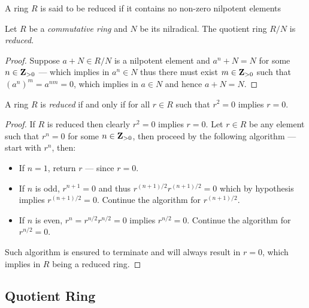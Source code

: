 \begin{definition}
\label{def:reduced-ring}
A ring \(R\) is said to be reduced if it contains no non-zero nilpotent elements
\end{definition}

\begin{corollary}
\label{cor:reducing-with-nilradical}
Let \(R\) be a \emph{commutative ring} and \(N\) be its nilradical. The quotient
ring \(R/N\) is \emph{reduced}.
\end{corollary}

\begin{proof}
Suppose \(a + N \in R/N\) is a nilpotent element and \(a^n + N = N\) for some
\(n \in \mathbf{Z}_{>0}\) --- which implies in \(a^n \in N\) thus there must exist
\(m \in \mathbf{Z}_{>0}\) such that \((a^n)^m = a^{nm} = 0\), which implies in
\(a \in N\) and hence \(a + N = N\).
\end{proof}

\begin{lemma}
\label{lem:reduced-iff-r2=0-implies-r=0}
A ring \(R\) is \emph{reduced} if and only if for all \(r \in R\) such that
\(r^2 = 0\) implies \(r = 0\).
\end{lemma}

\begin{proof}
If \(R\) is reduced then clearly \(r^2 = 0\) implies \(r = 0\). Let \(r \in R\)
be any element such that \(r^n = 0\) for some \(n \in \mathbf{Z}_{>0}\), then proceed
by the following algorithm --- start with \(r^n\), then:
\begin{itemize}\setlength\itemsep{0em}
\item If \(n = 1\), return \(r\) --- since \(r = 0\).
\item If \(n\) is odd, \(r^{n + 1} = 0\) and thus
  \(r^{(n+1)/2} r^{(n+1)/2} = 0\) which by hypothesis implies \(r^{(n+1)/2} =
  0\). Continue the algorithm for \(r^{(n+1)/2}\).
\item If \(n\) is even, \(r^n = r^{n/2} r^{n/2} = 0\) implies \(r^{n/2} =
  0\). Continue the algorithm for \(r^{n/2} = 0\).
\end{itemize}
Such algorithm is ensured to terminate and will always result in \(r = 0\),
which implies in \(R\) being a reduced ring.
\end{proof}

\subsection{Quotient Ring}

